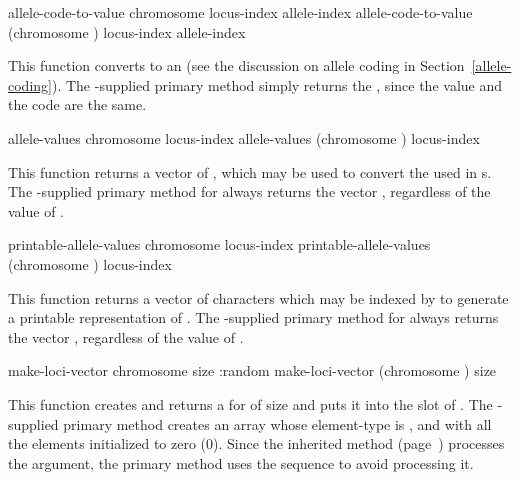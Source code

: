 {\filbreak
{\samepage
\Defgeneric allele-code-to-value {chromosome locus-index allele-index}
 allele-code-to-value {(chromosome ) locus-index allele-index}

This function converts  to an  (see the
discussion on allele coding in Section~\ref{allele-coding}). The \geco-supplied
primary method simply returns the , since the value and the code
are the same.
\par}%

\filbreak
{\samepage
\Defgeneric allele-values {chromosome locus-index}
 allele-values {(chromosome ) locus-index}

This function returns a vector of , which may be used to convert the
 used in s. The \geco-supplied primary method for
 always returns the vector , regardless of the
value of .
\par}%

\filbreak
{\samepage
\Defgeneric printable-allele-values {chromosome locus-index}
 printable-allele-values {(chromosome ) locus-index}

This function returns a vector of characters which may be indexed by 
to generate a printable representation of . The \geco-supplied primary
method for  always returns the vector ,
regardless of the value of .
\par}%

\filbreak
{\samepage
\Defgeneric make-loci-vector {chromosome size \key :random}
 make-loci-vector {(chromosome ) size \key \allow}

This function creates and returns a  for  of size 
and puts it into the  slot of . The \geco-supplied
primary method creates an array whose element-type is , and with all the
elements initialized to zero (0). Since the inherited  method
(page~\pageref{chromosome:make-loci-vector}) processes the  argument,
the primary method uses the \key \allow sequence to avoid processing it.
\par}%

}
